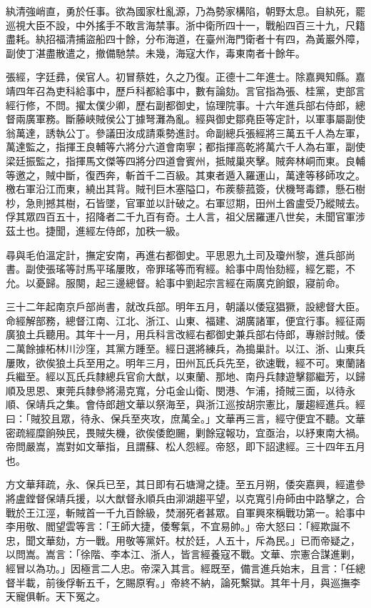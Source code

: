 \begin{pinyinscope}
紈清強峭直，勇於任事。欲為國家杜亂源，乃為勢家構陷，朝野太息。自紈死，罷巡視大臣不設，中外搖手不敢言海禁事。浙中衛所四十一，戰船四百三十九，尺籍盡耗。紈招福清捕盜船四十餘，分布海道，在臺州海門衛者十有四，為黃巖外障，副使丁湛盡散遣之，撤備馳禁。未幾，海寇大作，毒東南者十餘年。

張經，字廷彞，侯官人。初冒蔡姓，久之乃復。正德十二年進士。除嘉興知縣。嘉靖四年召為吏科給事中，歷戶科都給事中，數有論劾。言官指為張、桂黨，吏部言經行修，不問。擢太僕少卿，歷右副都御史，協理院事。十六年進兵部右侍郎，總督兩廣軍務。斷藤峽賊侯公丁據弩灘為亂。經與御史鄒堯臣等定計，以軍事屬副使翁萬達，誘執公丁。參議田汝成請乘勢進討。命副總兵張經將三萬五千人為左軍，萬達監之，指揮王良輔等六將分六道會南寧；都指揮高乾將萬六千人為右軍，副使梁廷振監之，指揮馬文傑等四將分四道會賓州，抵賊巢夾擊。賊奔林峒而東。良輔等邀之，賊中斷，復西奔，斬首千二百級。其東者遁入羅運山，萬達等移師攻之。檄右軍沿江而東，繞出其背。賊刊巨木塞隘口，布蒺藜菰簽，伏機弩毒鏢，懸石樹杪，急則撼其樹，石皆墜，官軍並以計破之。右軍愆期，田州土酋盧受乃縱賊去。俘其眾四百五十，招降者二千九百有奇。土人言，祖父居羅運八世矣，未聞官軍涉茲土也。捷聞，進經左侍郎，加秩一級。

尋與毛伯溫定計，撫定安南，再進右都御史。平思恩九土司及瓊州黎，進兵部尚書。副使張瑤等討馬平瑤屢敗，帝罪瑤等而宥經。給事中周怡劾經，經乞罷，不允。以憂歸。服闋，起三邊總督。給事中劉起宗言經在兩廣克餉銀，寢前命。

三十二年起南京戶部尚書，就改兵部。明年五月，朝議以倭寇猖獗，設總督大臣。命經解部務，總督江南、江北、浙江、山東、福建、湖廣諸軍，便宜行事。經征兩廣狼土兵聽用。其年十一月，用兵科言改經右都御史兼兵部右侍郎，專辦討賊。倭二萬餘據柘林川沙窪，其黨方踵至。經日選將練兵，為搗巢計。以江、浙、山東兵屢敗，欲俟狼土兵至用之。明年三月，田州瓦氏兵先至，欲速戰，經不可。東蘭諸兵繼至。經以瓦氏兵隸總兵官俞大猷，以東蘭、那地、南丹兵隸遊擊鄒繼芳，以歸順及思恩、東莞兵隸參將湯克寬，分屯金山衛、閔港、乍浦，掎賊三面，以待永順、保靖兵之集。會侍郎趙文華以祭海至，與浙江巡按胡宗憲比，屢趨經進兵。經曰：「賊狡且眾，待永、保兵至夾攻，庶萬全。」文華再三言，經守便宜不聽。文華密疏經糜餉殃民，畏賊失機，欲俟倭飽颺，剿餘寇報功，宜亟治，以紓東南大禍。帝問嚴嵩，嵩對如文華指，且謂蘇、松人怨經。帝怒，即下詔逮經。三十四年五月也。

方文華拜疏，永、保兵已至，其日即有石塘灣之捷。至五月朔，倭突嘉興，經遣參將盧鏜督保靖兵援，以大猷督永順兵由泖湖趨平望，以克寬引舟師由中路擊之，合戰於王江涇，斬賊首一千九百餘級，焚溺死者甚眾。自軍興來稱戰功第一。給事中李用敬、閻望雲等言：「王師大捷，倭奪氣，不宜易帥。」帝大怒曰：「經欺誕不忠，聞文華劾，方一戰。用敬等黨奸。杖於廷，人五十，斥為民。」已而帝疑之，以問嵩。嵩言：「徐階、李本江、浙人，皆言經養寇不戰。文華、宗憲合謀進剿，經冒以為功。」因極言二人忠。帝深入其言。經既至，備言進兵始末，且言：「任總督半載，前後俘斬五千，乞賜原宥。」帝終不納，論死繫獄。其年十月，與巡撫李天寵俱斬。天下冤之。


\end{pinyinscope}
